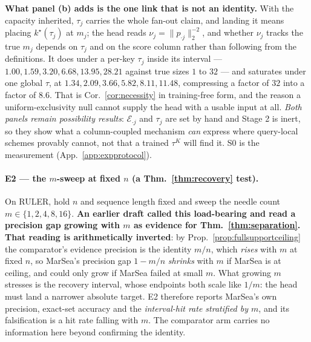 \documentclass{article}
\begin{document}
\textbf{What panel (b) adds is the one link that is not an identity.} With the capacity
inherited, $\tau_j$ carries the whole fan-out claim, and landing it means placing $k^\star(\tau_j)$
at $m_j$; the head reads $\nu_j = \|p_{\cdot j}\|_2^{-2}$, and whether $\nu_j$ tracks the true
$m_j$ depends on $\tau_j$ and on the score column rather than following from the definitions. It
does under a per-key $\tau_j$ inside its interval --- $1.00, 1.59, 3.20, 6.68, 13.95, 28.21$
against true sizes $1$ to $32$ --- and saturates under one global $\tau$, at
$1.34, 2.09, 3.66, 5.82, 8.11, 11.48$, compressing a factor of $32$ into a factor of $8.6$. That
is Cor.~\ref{cor:necessity} in training-free form, and the reason a uniform-exclusivity null
cannot supply the head with a usable input at all. \emph{Both panels remain possibility results}:
$\mathcal{E}_{\cdot j}$ and $\tau_j$ are set by hand and Stage 2 is inert, so they show what a
column-coupled mechanism \emph{can} express where query-local schemes provably cannot, not that a
trained $\tau^{K}$ will find it. S0 is the measurement (App.~\ref{app:expprotocol}).

\paragraph{E2 --- the $m$-sweep at fixed $n$ (a Thm.~\ref{thm:recovery} test).} On RULER, hold
$n$ and sequence length fixed and sweep the needle count $m\in\{1,2,4,8,16\}$. \textbf{An earlier
draft called this load-bearing and read a precision gap growing with $m$ as evidence for
Thm.~\ref{thm:separation}. That reading is arithmetically inverted}: by
Prop.~\ref{prop:fullsupportceiling} the comparator's evidence precision is the identity $m/n$,
which \emph{rises} with $m$ at fixed $n$, so MarSea's precision gap $1-m/n$ \emph{shrinks} with
$m$ if MarSea is at ceiling, and could only grow if MarSea failed at small $m$. What growing $m$
stresses is the recovery interval, whose endpoints both scale like $1/m$: the head must land a
narrower absolute target. E2 therefore reports MarSea's own precision, exact-set accuracy and the
\emph{interval-hit rate stratified by $m$}, and its falsification is a hit rate falling with $m$.
The comparator arm carries no information here beyond confirming the identity.
\end{document}
